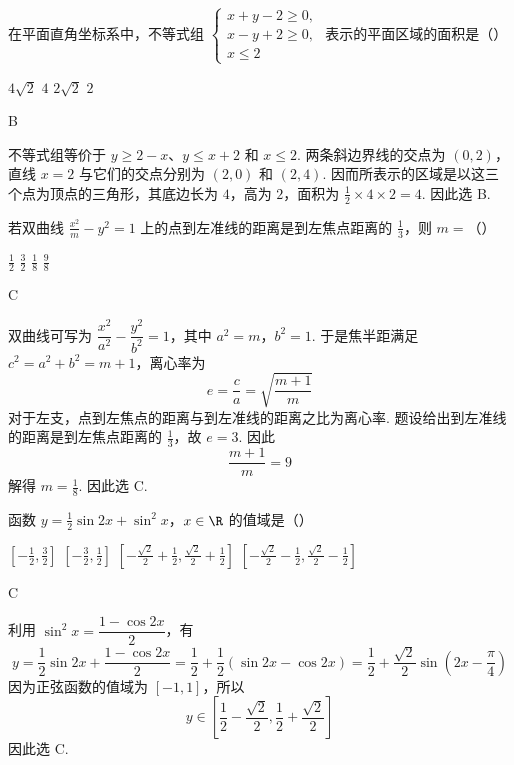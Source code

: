 \begin{problem}
在平面直角坐标系中，不等式组 \(\begin{cases}
x+y-2\geqslant0,\\
x-y+2\geqslant0,\\
x\leqslant2
\end{cases}\) 表示的平面区域的面积是（\quad）

\choices
    {\(4\sqrt{2}\)}
    {\(4\)}
    {\(2\sqrt{2}\)}
    {\(2\)}

\begin{answer}
B
\end{answer}

\begin{solution}
不等式组等价于 \(y\geqslant2-x\)、\(y\leqslant x+2\) 和 \(x\leqslant2\).
两条斜边界线的交点为 \((0,2)\)，直线 \(x=2\) 与它们的交点分别为 \((2,0)\) 和 \((2,4)\). 因而所表示的区域是以这三个点为顶点的三角形，其底边长为 \(4\)，高为 \(2\)，面积为 \(\frac12\times4\times2=4\). 因此选 B.
\end{solution}
\end{problem}

\begin{problem}
若双曲线 \(\frac{x^2}{m} - y^2 = 1\) 上的点到左准线的距离是到左焦点距离的 \(\frac{1}{3}\)，则 \(m =\)（\quad）

\choices
    {\(\frac{1}{2}\)}
    {\(\frac{3}{2}\)}
    {\(\frac{1}{8}\)}
    {\(\frac{9}{8}\)}

\begin{answer}
C
\end{answer}

\begin{solution}
双曲线可写为 \(\dfrac{x^2}{a^2}-\dfrac{y^2}{b^2}=1\)，其中 \(a^2=m\)，\(b^2=1\). 于是焦半距满足 \(c^2=a^2+b^2=m+1\)，离心率为
\[
e=\frac ca=\sqrt{\frac{m+1}{m}}
\]
对于左支，点到左焦点的距离与到左准线的距离之比为离心率. 题设给出到左准线的距离是到左焦点距离的 \(\frac13\)，故 \(e=3\). 因此
\[
\frac{m+1}{m}=9
\]
解得 \(m=\frac18\). 因此选 C.
\end{solution}
\end{problem}

\begin{problem}
函数 \(y = \frac{1}{2}\sin 2x + \sin^2 x\)，\(x \in \R\) 的值域是（\quad）

\choices
    {\(\left[-\frac{1}{2}, \frac{3}{2}\right]\)}
    {\(\left[-\frac{3}{2}, \frac{1}{2}\right]\)}
    {\(\left[-\frac{\sqrt{2}}{2} + \frac{1}{2}, \frac{\sqrt{2}}{2} + \frac{1}{2}\right]\)}
    {\(\left[-\frac{\sqrt{2}}{2} - \frac{1}{2}, \frac{\sqrt{2}}{2} - \frac{1}{2}\right]\)}

\begin{answer}
C
\end{answer}

\begin{solution}
利用 \(\sin^2x=\dfrac{1-\cos2x}{2}\)，有
\[
y=\frac12\sin2x+\frac{1-\cos2x}{2}=\frac12+\frac12(\sin2x-\cos2x)=\frac12+\frac{\sqrt2}{2}\sin\left(2x-\frac\pi4\right)
\]
因为正弦函数的值域为 \([-1,1]\)，所以
\[
y\in\left[\frac12-\frac{\sqrt2}{2},\frac12+\frac{\sqrt2}{2}\right]
\]
因此选 C.
\end{solution}
\end{problem}

